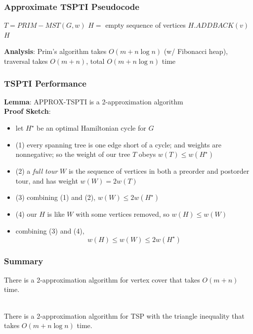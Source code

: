 \documentclass{beamer}
\newcommand{\stanza}{ \\~\ }
\begin{document}
\begin{frame} \frametitle{Approximate TSPTI Pseudocode}
  \begin{algorithmic}[1]
      \State $T = PRIM-MST(G, w)$
      \State $H = $ empty sequence of vertices
        \State $H.ADDBACK(v)$
      \EndFor
      \State \Return $H$
    \EndFunction
  \end{algorithmic}
\vspace{.5 cm}
\textbf{Analysis}: Prim's algorithm takes $O(m + n \log n)$ (w/ Fibonacci heap),
traversal takes $O(m + n)$, total $O(m + n \log n)$ time
\end{frame}

\begin{frame} \frametitle{TSPTI Performance}
\textbf{Lemma}: APPROX-TSPTI is a 2-approximation algorithm \\
\textbf{Proof Sketch}:
\begin{itemize}
  \item let $H^\star$ be an optimal Hamiltonian cycle for $G$
  \item (1) every spanning tree is one edge short of a cycle; and weights are nonnegative;
    so the weight of our tree $T$ obeys $w(T) \leq w(H^\star)$
  \item (2) a \emph{full tour} $W$ is the sequence of vertices in both a preorder and postorder
    tour, and has weight $w(W) = 2 w(T)$
  \item (3) combining (1) and (2), $w(W) \leq 2 w(H^\star)$
  \item (4) our $H$ is like $W$ with some vertices removed, so $w(H) \leq w(W)$
  \item combining (3) and (4),
    \[ w(H) \leq w(W) \leq 2 w(H^\star) \]
\end{itemize}
\end{frame}

\begin{frame} \frametitle{Summary}

There is a 2-approximation algorithm for vertex cover that takes $O(m+n)$ time.
\stanza

There is a 2-approximation algorithm for TSP with the triangle inequality
that takes $O(m + n \log n)$ time.
\end{frame}
\end{document}
